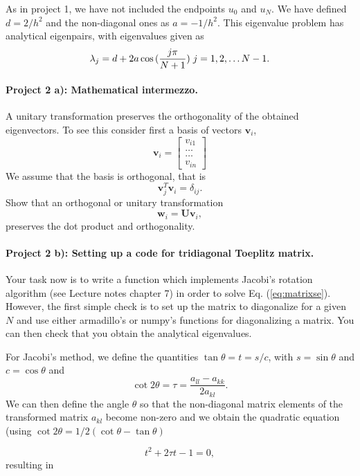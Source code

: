 \documentclass[%
oneside,                 %
final,                   %
10pt]{article}
\begin{document}
As in project 1, we have not included the endpoints $u_0$ and $u_N$. 
We have defined $d=2/h^2$ and the non-diagonal ones as $a=-1/h^2$. This eigenvalue problem has analytical eigenpairs, with eigenvalues given as 
\[
\lambda_j = d+2a\cos{(\frac{j\pi}{N+1})} \hspace{0.1cm} j=1,2,\dots N-1.
\]


\paragraph{Project 2 a): Mathematical intermezzo.}
A unitary transformation preserves  the orthogonality of the obtained eigenvectors. To see this consider first a basis of vectors $\mathbf{v}_i$,
\[
\mathbf{v}_i = \begin{bmatrix} v_{i1} \\ \dots \\ \dots \\v_{in} \end{bmatrix}
\]
We assume that the basis is orthogonal, that is 
\[
\mathbf{v}_j^T\mathbf{v}_i = \delta_{ij}.
\]
Show that an orthogonal or unitary transformation
\[
\mathbf{w}_i=\mathbf{U}\mathbf{v}_i,
\]
preserves the dot product and orthogonality. 

\paragraph{Project 2 b): Setting up a code for tridiagonal Toeplitz matrix.}
Your task now is to write a function which implements Jacobi's rotation algorithm (see Lecture notes chapter 7)  in order to solve Eq. (\ref{eq:matrixse}).  
However, the first simple check is to set up the matrix to diagonalize for a given $N$ and use either armadillo's or numpy's functions for diagonalizing a matrix. You can then check that you obtain the analytical eigenvalues. 

For Jacobi's method,
we define the quantities $\tan\theta = t= s/c$, with $s=\sin\theta$ and $c=\cos\theta$ and
\begin{equation*}\cot 2\theta=\tau = \frac{a_{ll}-a_{kk}}{2a_{kl}}.
\end{equation*}
We can then define the angle $\theta$ so that the non-diagonal matrix elements of the transformed matrix 
$a_{kl}$ become non-zero and
we obtain the quadratic equation (using $\cot 2\theta=1/2(\cot \theta-\tan\theta)$

\begin{equation*}
t^2+2\tau t-1= 0,
\end{equation*}
resulting in
\end{document}
